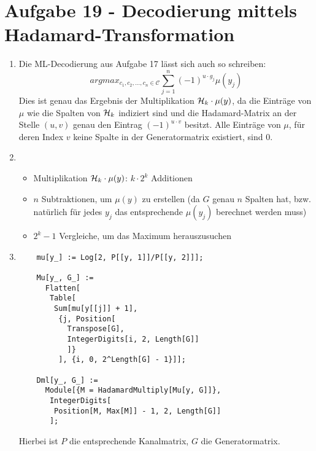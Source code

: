 \section*{Aufgabe 19 - Decodierung mittels Hadamard-Transformation}
\begin{enumerate}
	\item
	Die ML-Decodierung aus Aufgabe 17 lässt sich auch so schreiben:
	\[ argmax_{c_{1},c_{2},\dots,c_{n}\in\mathcal{C}}\sum_{j=1}^{n}
	(-1)^{u\cdot g_{j}}\mu(y_{j}) \]
	Dies ist genau das Ergebnis der Multiplikation $\mathcal{H}_{k} \cdot \mu(y)$, da
	die Einträge von $\mu$ wie die Spalten von $\mathcal{H}_{k}$ indiziert sind und die
	Hadamard-Matrix an der Stelle $(u, v)$ genau den Eintrag
	$(-1)^{u\cdot v}$ besitzt. Alle Einträge von $\mu$, für deren Index $v$
	keine Spalte in der Generatormatrix existiert, sind $0$.
	\item
	\begin{itemize}
	\item Multiplikation $\mathcal{H}_{k} \cdot \mu(y)$: $k \cdot 2^{k}$ Additionen
	\item $n$ Subtraktionen, um $\mu(y)$ zu erstellen (da $G$ genau $n$
	Spalten hat, bzw. natürlich für jedes $y_{j}$ das entsprechende
	$\mu(y_{j})$ berechnet werden muss)
	\item $2^{k} - 1$ Vergleiche, um das Maximum herauszusuchen
	\end{itemize}
	\item
	\lstset{ %
		language=Mathematica,
		basicstyle=\small,
		numbers=left,
		numberstyle=\small,
		numbersep=-9pt
	}
	\begin{lstlisting}
	mu[y_] := Log[2, P[[y, 1]]/P[[y, 2]]];

	Mu[y_, G_] :=
	  Flatten[
	   Table[
	    Sum[mu[y[[j]] + 1],
	     {j, Position[
	       Transpose[G],
	       IntegerDigits[i, 2, Length[G]]
	       ]}
	     ], {i, 0, 2^Length[G] - 1}]];

	Dml[y_, G_] :=
	  Module[{M = HadamardMultiply[Mu[y, G]]},
	   IntegerDigits[
	    Position[M, Max[M]] - 1, 2, Length[G]]
	   ];
	\end{lstlisting}
	Hierbei ist $P$ die entsprechende Kanalmatrix, $G$ die Generatormatrix.
\end{enumerate}
